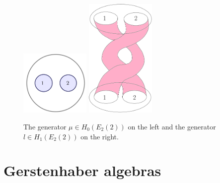 \documentclass{beamer}
\theoremstyle{definition}
\begin{document}
\begin{frame}
	\begin{figure}
		\includegraphics[width=0.3\textwidth]{Imagenes/genera}
		\includegraphics[width=0.3\textwidth]{Imagenes/generador}
		\caption{The generator $\mu\in H_0(E_2(2))$ on the left and the generator $l\in H_1(E_2(2))$ on the right.}
	\end{figure}
\end{frame}




\section{Gerstenhaber algebras}
\end{document}
